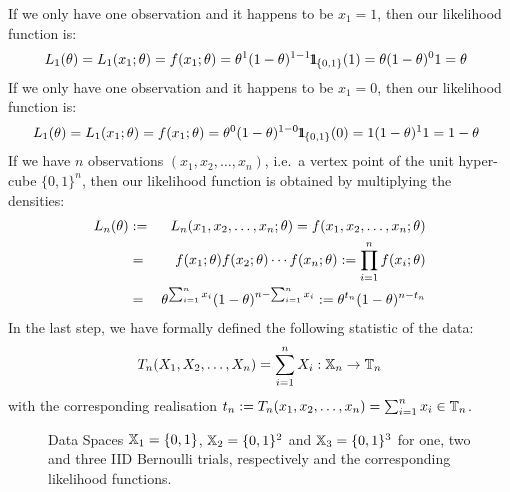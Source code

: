 {\begin{example}
If we only have one observation and it happens to be $x_1=1$, then our likelihood function is:
$$L_1(\theta)=L_1(x_1;\theta)
= f(x_1;\theta)
=\theta^{1}(1-\theta)^{1-1} {1}\mspace{-11 mu}{1}_{\{0,1\}}(1)
=\theta (1-\theta)^0 1
=\theta \enspace
$$
If we only have one observation and it happens to be $x_1=0$, then our likelihood function is:
$$L_1(\theta)=L_1(x_1;\theta)
= f(x_1;\theta)
=\theta^{0}(1-\theta)^{1-0} {1}\mspace{-11 mu}{1}_{\{0,1\}}(0)
=1 (1-\theta)^1 1
=1-\theta \enspace
$$
If we have $n$ observations $(x_1,x_2,\ldots,x_n)$, i.e.~a vertex point of the unit hyper-cube $\{0,1\}^n$, then our likelihood function is obtained by multiplying the densities:
\begin{eqnarray}
L_n(\theta) &:=& L_n(x_1,x_2,\ldots,x_n; \theta)  = f(x_1,x_2,\ldots,x_n ; \theta) \notag \\
&=& f(x_1 ; \theta) f(x_2 ; \theta) \cdots f(x_n ; \theta) := \prod_{i=1}^n f(x_i ; \theta) \notag \\
&=& \theta^{\sum_{i=1}^n x_i} (1-\theta)^ {n-\sum_{i=1}^n x_i} := \theta^{t_n} (1-\theta)^{n-t_n} \notag 
\end{eqnarray}
In the last step, we have formally defined the following statistic of the data: 
$$T_n(X_1,X_2,\ldots,X_n)=\sum_{i=1}^n X_i :  \mathbb{X}_n \rightarrow \mathbb{T}_n$$ with the corresponding realisation $t_n := T_n(x_1,x_2,\ldots,x_n)=\sum_{i=1}^n x_i \in \mathbb{T}_n$. 
\end{example}

\begin{figure}[ht]
\caption{Data Spaces $\mathbb{X}_1=\{0,1\}$, $\mathbb{X}_2=\{0,1\}^2$ and $\mathbb{X}_3=\{0,1\}^3$ for one, two and three IID Bernoulli trials, respectively and the corresponding likelihood functions.\label{F:BernoulliSampleLkl}}
\centering   {}
\end{figure}

}
